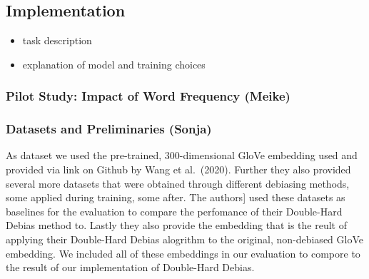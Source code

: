 \documentclass[
  english,
  man,floatsintext]{apa6}
\providecommand{\tightlist}{%
  \setlength{\itemsep}{0pt}\setlength{\parskip}{0pt}}
\begin{document}
\hypertarget{implementation}{%
\subsection{Implementation}\label{implementation}}

\begin{itemize}
\tightlist
\item
  task description
\item
  explanation of model and training choices
\end{itemize}

\hypertarget{pilot-study-impact-of-word-frequency-meike}{%
\subsubsection{Pilot Study: Impact of Word Frequency (Meike)}\label{pilot-study-impact-of-word-frequency-meike}}

\hypertarget{datasets-and-preliminaries-sonja}{%
\subsubsection{Datasets and Preliminaries (Sonja)}\label{datasets-and-preliminaries-sonja}}

As dataset we used the pre-trained, 300-dimensional GloVe embedding used and provided via link on Github by Wang et al.~(2020). Further they also provided several more datasets that were obtained through different debiasing methods, some applied during training, some after. The authors{]} used these datasets as baselines for the evaluation to compare the perfomance of their Double-Hard Debias method to. Lastly they also provide the embedding that is the reult of applying their Double-Hard Debias alogrithm to the original, non-debiased GloVe embedding. We included all of these embeddings in our evaluation to compore to the result of our implementation of Double-Hard Debias.
\end{document}
